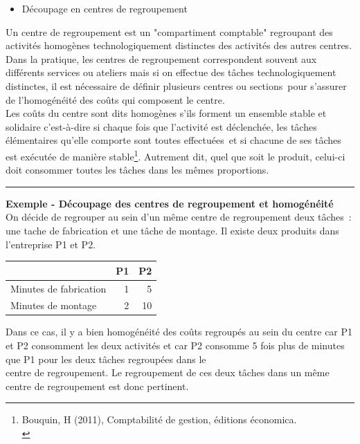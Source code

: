 \documentclass{kaobook}
\begin{document}
\begin{itemize}
\item Découpage en centres de regroupement\\
\end{itemize}

Un centre de regroupement est un "compartiment comptable" regroupant des activités homogènes technologiquement distinctes des activités des autres centres. Dans la pratique, les centres de regroupement correspondent souvent aux différents services ou ateliers mais si on effectue des tâches technologiquement distinctes, il est nécessaire de définir plusieurs centres ou sections pour s'assurer de l'homogénéité des coûts qui composent le centre.\\

Les coûts du centre sont dits homogènes s'ils forment un ensemble stable et solidaire c'est-à-dire si chaque fois que l'activité est déclenchée, les tâches élémentaires qu'elle comporte sont toutes effectuées et si chacune de ses tâches est exécutée de manière stable\footnote{Bouquin, H (2011), Comptabilité de gestion, éditions économica.\\}. Autrement dit, quel que soit le produit, celui-ci doit consommer toutes les tâches dans les mêmes proportions.\\

\noindent\rule{\textwidth}{0.5pt}
\textbf{Exemple - Découpage des centres de regroupement et homogénéité}\\

On décide de regrouper au sein d'un même centre de regroupement deux tâches : une tache de fabrication et une tâche de montage. Il existe deux produits dans l'entreprise P1 et P2.\\

\begin{center}
\begin{tabular}{lrr}
 & P1 & P2\\
\hline
Minutes de fabrication & 1 & 5\\
Minutes de montage & 2 & 10\\
\end{tabular}
\end{center}

Dans ce cas, il y a bien homogénéité des coûts regroupés au sein du centre car P1 et P2 consomment les deux activités et car P2 consomme 5 fois plus de minutes que P1 pour les deux tâches regroupées dans le\\
centre de regroupement. Le regroupement de ces deux tâches dans un même centre de regroupement est donc pertinent.\\
\end{document}
